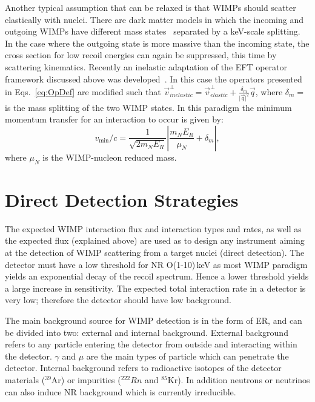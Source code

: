 	    Another typical assumption that can be relaxed is that WIMPs should scatter elastically with nuclei. There are dark matter models in which the incoming and outgoing WIMPs have different mass states~\cite{InelasticIntro} separated by a keV-scale splitting. In the case where the outgoing state is more massive than the incoming state, the cross section for low recoil energies can again be suppressed, this time by scattering kinematics. Recently an inelastic adaptation of the EFT operator framework discussed above was developed~\cite{InelasticMath}. In this case the operators presented in Eqs.~\ref{eq:OpDef} are modified such that $\vec{v}^{\perp}_{inelastic} = \vec{v}^{\perp}_{elastic} +\frac{\delta_m}{\vert{\vec{q}}\vert^2}\vec{q}$, where $\delta_m = $ is the mass splitting of the two WIMP states. In this paradigm the minimum momentum transfer for an interaction to occur is given by:
\begin{equation}
  v_\mathrm{min}/c = \frac{1}{\sqrt{2 m_N E_R}} \left|\frac{m_N E_R}{\mu_N} + \delta_m\right|,
\end{equation}
where $\mu_N$ is the WIMP-nucleon reduced mass.



\section{Direct Detection Strategies}
\label{sec:detStrtegies}

The expected WIMP interaction flux and interaction types and rates, as well as the expected flux (explained above) are used as to design any instrument aiming at the detection of WIMP scattering from a target nuclei (direct detection). The detector must have a low threshold for NR O(1-10)\,keV as most WIMP paradigm yields an exponential decay of the recoil spectrum. Hence a lower threshold yields a large increase in sensitivity. The expected total interaction rate in a detector is very low; therefore the detector should have low background.


The main background source for WIMP detection is in the form of ER, and can be divided into two: external and internal background. External background refers to any particle entering the detector from outside and interacting within the detector. $\gamma$ and $\mu$ are the main types of particle which can penetrate the detector. Internal background refers to radioactive isotopes of the detector materials ($^{39}$Ar) or impurities ($^{222}Rn$ and $^{85}$Kr).
In addition neutrons or neutrinos can also induce NR background which is currently irreducible. 


